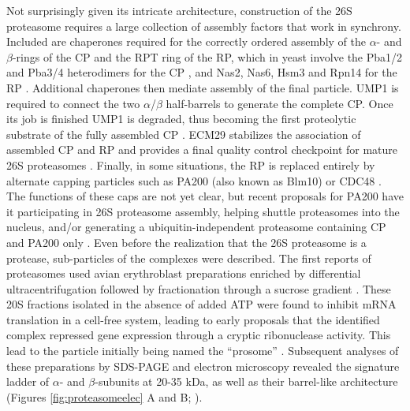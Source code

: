 	Not surprisingly given its intricate architecture, construction of the 26S proteasome requires a large collection of assembly factors that work in synchrony.  Included are chaperones required for the correctly ordered assembly of the $\alpha$- and $\beta$-rings of the CP and the RPT ring of the RP, which in yeast involve the Pba1/2 and Pba3/4 heterodimers for the CP \citep{kusmierczyk08, le07, tomko13}, and Nas2, Nas6, Hsm3 and Rpn14 for the RP \citep{funakoshi09, roelofs09, saeki09, tomko13}.  Additional chaperones then mediate assembly of the final particle.  UMP1 is required to connect the two $\alpha$/$\beta$ half-barrels to generate the complete CP.  Once its job is finished UMP1 is degraded, thus becoming the first proteolytic substrate of the fully assembled CP \citep{ramos98}.  ECM29 stabilizes the association of assembled CP and RP and provides a final quality control checkpoint for mature 26S proteasomes \citep{besche14, lehmann10}.  Finally, in some situations, the RP is replaced entirely by alternate capping particles such as PA200 (also known as Blm10) or CDC48 \citep{barthelme12, book10, schmidt05}.  The functions of these caps are not yet clear, but recent proposals for PA200 have it participating in 26S proteasome assembly, helping shuttle proteasomes into the nucleus, and/or generating a ubiquitin-independent proteasome containing CP and PA200 only \citep{dange11, sadre-bazzaz10, weberruss13}. 
	Even before the realization that the 26S proteasome is a protease, sub-particles of the complexes were described.  The first reports of proteasomes used avian erythroblast preparations enriched by differential ultracentrifugation followed by fractionation through a sucrose gradient \citep{schmid84}.  These 20S fractions isolated in the absence of added ATP were found to inhibit mRNA translation in a cell-free system, leading to early proposals that the identified complex repressed gene expression through a cryptic ribonuclease activity.  This lead to the particle initially being named the ``prosome'' \citep{kremp86, schmid84}.  Subsequent analyses of these preparations by SDS-PAGE and electron microscopy revealed the signature ladder of $\alpha$- and $\beta$-subunits at 20-35 kDa, as well as their barrel-like architecture (Figures \ref{fig:proteasomeelec} A and B; \citep{baumeister88, kremp86, schmid84}).
